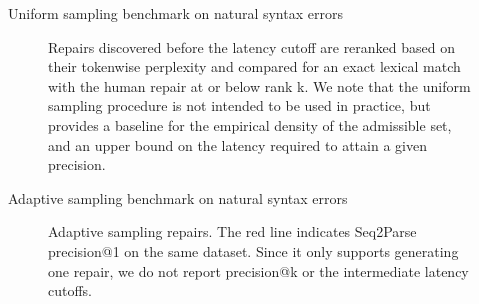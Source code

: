 \documentclass{beamer}
\begin{document}
\begin{frame}[fragile]{Uniform sampling benchmark on natural syntax errors}
  \begin{figure}[H]
    \resizebox{.3\textwidth}{!}{}
    \resizebox{.3\textwidth}{!}{}
    \resizebox{.3\textwidth}{!}{}
    \caption{Repairs discovered before the latency cutoff are reranked based on their tokenwise perplexity and compared for an exact lexical match with the human repair at or below rank k. We note that the uniform sampling procedure is not intended to be used in practice, but provides a baseline for the empirical density of the admissible set, and an upper bound on the latency required to attain a given precision.}\label{fig:human}
  \end{figure}
\end{frame}

\begin{frame}[fragile]{Adaptive sampling benchmark on natural syntax errors}
  \begin{figure}[H]
    \resizebox{.24\textwidth}{!}{}
    \resizebox{.25\textwidth}{!}{}
    \resizebox{.24\textwidth}{!}{}
    \resizebox{.24\textwidth}{!}{}
    \caption{Adaptive sampling repairs. The red line indicates Seq2Parse precision@1 on the same dataset. Since it only supports generating one repair, we do not report precision@k or the intermediate latency cutoffs.}\label{fig:adaptive}
  \end{figure}
\end{frame}
\end{document}
